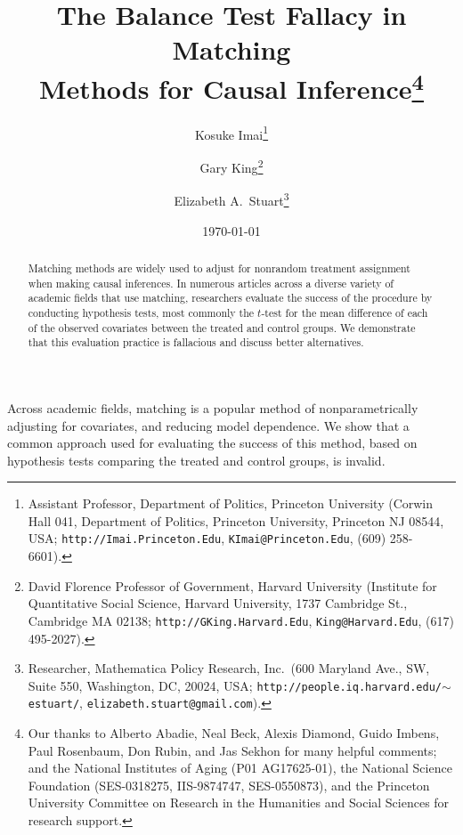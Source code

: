 \documentclass[11pt,titlepage]{article}
\title{The Balance Test Fallacy in Matching\\ Methods for Causal
  Inference\thanks{Our thanks to Alberto Abadie, Neal Beck, Alexis
    Diamond, Guido Imbens, Paul Rosenbaum, Don Rubin, and Jas Sekhon
    for many helpful comments; and the National Institutes of Aging
    (P01 AG17625-01), the National Science Foundation (SES-0318275,
    IIS-9874747, SES-0550873), and the Princeton University Committee
    on Research in the Humanities and Social Sciences for research
    support.}}
\author{Kosuke Imai\thanks{Assistant Professor, Department of
    Politics, Princeton University (Corwin Hall 041, Department of
    Politics, Princeton University, Princeton NJ 08544, USA;
    \texttt{http://Imai.Princeton.Edu}, \texttt{KImai@Princeton.Edu},
    (609) 258-6601).}
\and 
  Gary King\thanks{David Florence Professor of Government, Harvard
    University (Institute for Quantitative Social Science, Harvard
    University, 1737 Cambridge St., Cambridge MA 02138;
    \texttt{http://GKing.Harvard.Edu}, \texttt{King@Harvard.Edu},
    (617) 495-2027).}
\and 
  Elizabeth A.\ Stuart\thanks{Researcher, Mathematica Policy Research,
    Inc.\, (600 Maryland Ave., SW, Suite 550, Washington, DC, 20024,
    USA; \texttt{http://people.iq.harvard.edu/$\sim$estuart/},
    \texttt{elizabeth.stuart@gmail.com}).}}
\date{\today}
\begin{document}
\maketitle

\begin{abstract}
  Matching methods are widely used to adjust for nonrandom treatment
  assignment when making causal inferences.  In numerous articles
  across a diverse variety of academic fields that use matching,
  researchers evaluate the success of the procedure by conducting
  hypothesis tests, most commonly the $t$-test for the mean difference
  of each of the observed covariates between the treated and control
  groups. We demonstrate that this evaluation practice is fallacious
  and discuss better alternatives.
\end{abstract}

Across academic fields, matching is a popular method of
nonparametrically adjusting for covariates, and reducing model
dependence.  We show that a common approach used for evaluating the
success of this method, based on hypothesis tests comparing the
treated and control groups, is invalid.
\end{document}
